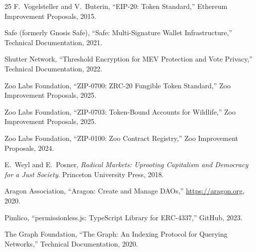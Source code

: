 \documentclass[11pt,letterpaper]{article}
\begin{document}
\begin{thebibliography}{25}
F.~Vogelsteller and V.~Buterin, ``EIP-20: Token Standard,'' Ethereum Improvement Proposals, 2015.

Safe (formerly Gnosis Safe), ``Safe: Multi-Signature Wallet Infrastructure,'' Technical Documentation, 2021.

Shutter Network, ``Threshold Encryption for MEV Protection and Vote Privacy,'' Technical Documentation, 2022.

Zoo Labs Foundation, ``ZIP-0700: ZRC-20 Fungible Token Standard,'' Zoo Improvement Proposals, 2025.

Zoo Labs Foundation, ``ZIP-0703: Token-Bound Accounts for Wildlife,'' Zoo Improvement Proposals, 2025.

Zoo Labs Foundation, ``ZIP-0100: Zoo Contract Registry,'' Zoo Improvement Proposals, 2024.

E.~Weyl and E.~Posner, \textit{Radical Markets: Uprooting Capitalism and Democracy for a Just Society}. Princeton University Press, 2018.

Aragon Association, ``Aragon: Create and Manage DAOs,'' \url{https://aragon.org}, 2020.

Pimlico, ``permissionless.js: TypeScript Library for ERC-4337,'' GitHub, 2023.

The Graph Foundation, ``The Graph: An Indexing Protocol for Querying Networks,'' Technical Documentation, 2020.

\end{thebibliography}
\end{document}
